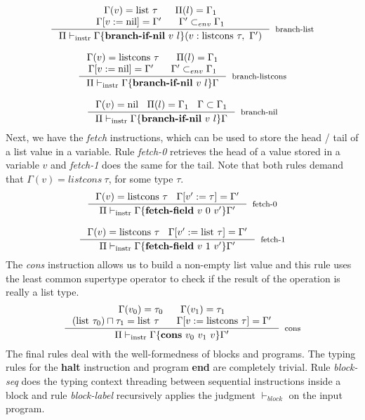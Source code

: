 \documentclass[review]{elsarticle}
\theoremstyle{definition}
\begin{document}
\[
\begin{array}{c}
\inference{\Gamma(v) = \text{list}~\tau\:\:\:\:\:\:\:\:\Pi(l) = \Gamma_1\\
                     \Gamma[v:=\text{nil}]=\Gamma'\:\:\:\:\:\:\:\:\Gamma' \subset_{env} \Gamma_1}
          {\Pi \vdash_{\text{instr}} \Gamma\{ \textbf{branch-if-nil}~v~l \}(v: \text{listcons}~\tau,~\Gamma')}
          [branch-list]
\\ \\

\inference{\Gamma(v) = \text{listcons}~\tau\:\:\:\:\:\:\:\:\Pi(l) = \Gamma_1\\
           \Gamma[v:=\text{nil}]=\Gamma'\:\:\:\:\:\:\:\:\Gamma' \subset_{env} \Gamma_1}
          {\Pi \vdash_{\text{instr}} \Gamma\{ \textbf{branch-if-nil}~v~l \}\Gamma}[branch-listcons]

\\ \\
\inference{\Gamma(v) = \text{nil}\:\:\:\:\Pi(l) = \Gamma_1\:\:\:\:\Gamma \subset \Gamma_1}
          {\Pi \vdash_{\text{instr}} \Gamma\{ \textbf{branch-if-nil}~v~l \}\Gamma}
          [branch-nil]
\end{array}
\]
Next, we have the \emph{fetch} instructions, which can be used to store the head / tail of a list value in
a variable. Rule \emph{fetch-0} retrieves the head of a value stored in a variable $v$ and \emph{fetch-1}
does the same for the tail. Note that both rules demand that $\Gamma(v) = listcons\:\tau$, for some type
$\tau$.
\[
\begin{array}{c}
\inference{\Gamma(v) = \text{listcons}~\tau\:\:\:\:\Gamma[v':=\tau]=\Gamma'}
          {\Pi \vdash_{\text{instr}} \Gamma\{ \textbf{fetch-field}~v~0~v' \}\Gamma'}[fetch-0]
          \\ \\
\inference{\Gamma(v) = \text{listcons}~\tau\:\:\:\:\Gamma[v':=\text{list}~\tau]=\Gamma'}
          {\Pi \vdash_{\text{instr}} \Gamma\{ \textbf{fetch-field}~v~1~v' \}\Gamma'}[fetch-1]
\end{array}
\]
The \emph{cons} instruction allows us to build a non-empty list value and this rule uses the least
common supertype operator to check if the result of the operation is really a list type.
\[
\inference{\Gamma(v_0) = \tau_0\:\:\:\:\:\:\:\:\Gamma(v_1) = \tau_1 \\
           (\text{list}~\tau_0) \sqcap \tau_1=\text{list}~\tau\:\:\:\:\:\:\:\:\Gamma[v:=\text{listcons}~\tau]=\Gamma'}
          {\Pi \vdash_{\text{instr}} \Gamma\{ \textbf{cons}~v_0~v_1~v \}\Gamma'}[cons]
\]
The final rules deal with the well-formedness of blocks and programs. The typing rules for the \textbf{halt} instruction and
program \textbf{end} are completely trivial. Rule \emph{block-seq} does the typing context threading between sequential
instructions inside a block and rule \emph{block-label} recursively applies the judgment $\vdash_{block}$ on the
input program.
\end{document}
